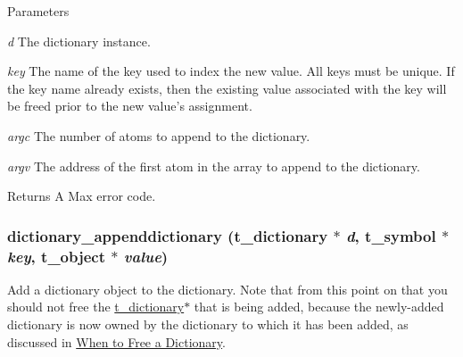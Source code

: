 \begin{DoxyParams}{Parameters}
\item[{\em d}]The dictionary instance. \item[{\em key}]The name of the key used to index the new value. All keys must be unique. If the key name already exists, then the existing value associated with the key will be freed prior to the new value's assignment. \item[{\em argc}]The number of atoms to append to the dictionary. \item[{\em argv}]The address of the first atom in the array to append to the dictionary. \end{DoxyParams}
\begin{DoxyReturn}{Returns}
A Max error code. 
\end{DoxyReturn}
\hypertarget{group__dictionary_ga1bd7575368917037f46b5b9076e167c7}{
\subsubsection[{dictionary\_\-appenddictionary}]{ dictionary\_\-appenddictionary ({\bf t\_\-dictionary} $\ast$ {\em d}, \/  {\bf t\_\-symbol} $\ast$ {\em key}, \/  {\bf t\_\-object} $\ast$ {\em value})}}
\label{group__dictionary_ga1bd7575368917037f46b5b9076e167c7}


Add a dictionary object to the dictionary. Note that from this point on that you should not free the \hyperlink{structt__dictionary}{t\_\-dictionary}$\ast$ that is being added, because the newly-\/added dictionary is now owned by the dictionary to which it has been added, as discussed in \hyperlink{group__dictionary_when_to_free_a_dictionary}{When to Free a Dictionary}.


